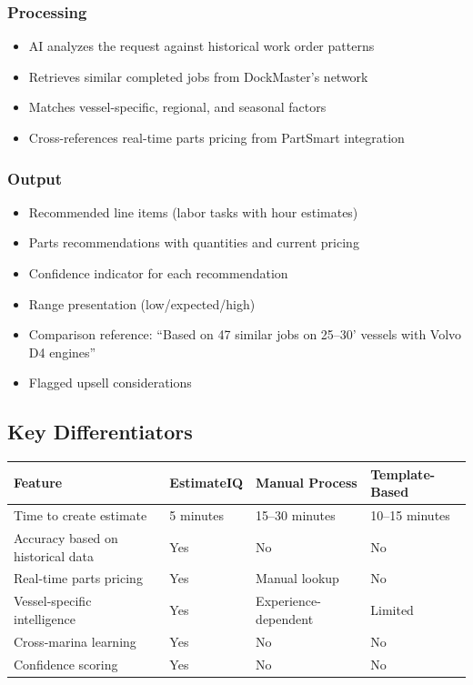 \documentclass[11pt,a4paper]{article}
\begin{document}
\subsubsection*{Processing}
\begin{itemize}[leftmargin=*]
    \item AI analyzes the request against historical work order patterns
    \item Retrieves similar completed jobs from DockMaster's network
    \item Matches vessel-specific, regional, and seasonal factors
    \item Cross-references real-time parts pricing from PartSmart integration
\end{itemize}

\subsubsection*{Output}
\begin{itemize}[leftmargin=*]
    \item Recommended line items (labor tasks with hour estimates)
    \item Parts recommendations with quantities and current pricing
    \item Confidence indicator for each recommendation
    \item Range presentation (low/expected/high)
    \item Comparison reference: ``Based on 47 similar jobs on 25--30' vessels with Volvo D4 engines''
    \item Flagged upsell considerations
\end{itemize}

\subsection{Key Differentiators}

\begin{table}[H]
\centering
\small
\begin{tabularx}{\textwidth}{@{}L{3.5cm}C{2.5cm}C{2.5cm}C{2.5cm}@{}}
\toprule
\textbf{Feature} & \textbf{EstimateIQ} & \textbf{Manual Process} & \textbf{Template-Based} \\
\midrule
Time to create estimate & 5 minutes & 15--30 minutes & 10--15 minutes \\
Accuracy based on historical data & Yes & No & No \\
Real-time parts pricing & Yes & Manual lookup & No \\
Vessel-specific intelligence & Yes & Experience-dependent & Limited \\
Cross-marina learning & Yes & No & No \\
Confidence scoring & Yes & No & No \\
\bottomrule
\end{tabularx}
\end{table}
\end{document}
